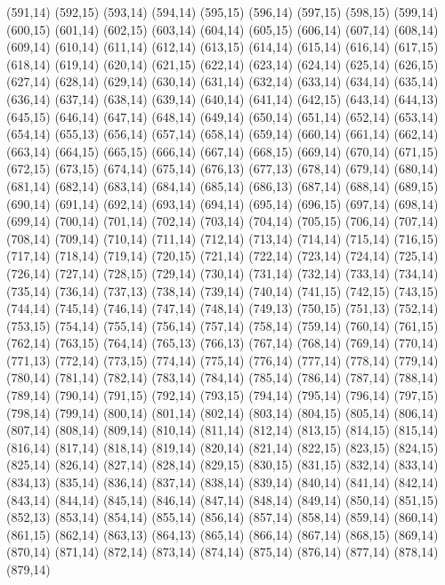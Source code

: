 (591,14)
(592,15)
(593,14)
(594,14)
(595,15)
(596,14)
(597,15)
(598,15)
(599,14)
(600,15)
(601,14)
(602,15)
(603,14)
(604,14)
(605,15)
(606,14)
(607,14)
(608,14)
(609,14)
(610,14)
(611,14)
(612,14)
(613,15)
(614,14)
(615,14)
(616,14)
(617,15)
(618,14)
(619,14)
(620,14)
(621,15)
(622,14)
(623,14)
(624,14)
(625,14)
(626,15)
(627,14)
(628,14)
(629,14)
(630,14)
(631,14)
(632,14)
(633,14)
(634,14)
(635,14)
(636,14)
(637,14)
(638,14)
(639,14)
(640,14)
(641,14)
(642,15)
(643,14)
(644,13)
(645,15)
(646,14)
(647,14)
(648,14)
(649,14)
(650,14)
(651,14)
(652,14)
(653,14)
(654,14)
(655,13)
(656,14)
(657,14)
(658,14)
(659,14)
(660,14)
(661,14)
(662,14)
(663,14)
(664,15)
(665,15)
(666,14)
(667,14)
(668,15)
(669,14)
(670,14)
(671,15)
(672,15)
(673,15)
(674,14)
(675,14)
(676,13)
(677,13)
(678,14)
(679,14)
(680,14)
(681,14)
(682,14)
(683,14)
(684,14)
(685,14)
(686,13)
(687,14)
(688,14)
(689,15)
(690,14)
(691,14)
(692,14)
(693,14)
(694,14)
(695,14)
(696,15)
(697,14)
(698,14)
(699,14)
(700,14)
(701,14)
(702,14)
(703,14)
(704,14)
(705,15)
(706,14)
(707,14)
(708,14)
(709,14)
(710,14)
(711,14)
(712,14)
(713,14)
(714,14)
(715,14)
(716,15)
(717,14)
(718,14)
(719,14)
(720,15)
(721,14)
(722,14)
(723,14)
(724,14)
(725,14)
(726,14)
(727,14)
(728,15)
(729,14)
(730,14)
(731,14)
(732,14)
(733,14)
(734,14)
(735,14)
(736,14)
(737,13)
(738,14)
(739,14)
(740,14)
(741,15)
(742,15)
(743,15)
(744,14)
(745,14)
(746,14)
(747,14)
(748,14)
(749,13)
(750,15)
(751,13)
(752,14)
(753,15)
(754,14)
(755,14)
(756,14)
(757,14)
(758,14)
(759,14)
(760,14)
(761,15)
(762,14)
(763,15)
(764,14)
(765,13)
(766,13)
(767,14)
(768,14)
(769,14)
(770,14)
(771,13)
(772,14)
(773,15)
(774,14)
(775,14)
(776,14)
(777,14)
(778,14)
(779,14)
(780,14)
(781,14)
(782,14)
(783,14)
(784,14)
(785,14)
(786,14)
(787,14)
(788,14)
(789,14)
(790,14)
(791,15)
(792,14)
(793,15)
(794,14)
(795,14)
(796,14)
(797,15)
(798,14)
(799,14)
(800,14)
(801,14)
(802,14)
(803,14)
(804,15)
(805,14)
(806,14)
(807,14)
(808,14)
(809,14)
(810,14)
(811,14)
(812,14)
(813,15)
(814,15)
(815,14)
(816,14)
(817,14)
(818,14)
(819,14)
(820,14)
(821,14)
(822,15)
(823,15)
(824,15)
(825,14)
(826,14)
(827,14)
(828,14)
(829,15)
(830,15)
(831,15)
(832,14)
(833,14)
(834,13)
(835,14)
(836,14)
(837,14)
(838,14)
(839,14)
(840,14)
(841,14)
(842,14)
(843,14)
(844,14)
(845,14)
(846,14)
(847,14)
(848,14)
(849,14)
(850,14)
(851,15)
(852,13)
(853,14)
(854,14)
(855,14)
(856,14)
(857,14)
(858,14)
(859,14)
(860,14)
(861,15)
(862,14)
(863,13)
(864,13)
(865,14)
(866,14)
(867,14)
(868,15)
(869,14)
(870,14)
(871,14)
(872,14)
(873,14)
(874,14)
(875,14)
(876,14)
(877,14)
(878,14)
(879,14)
